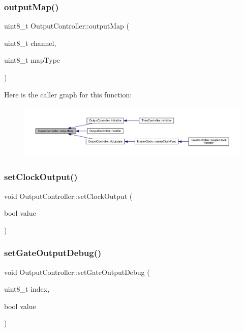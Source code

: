 \subsubsection{\texorpdfstring{output\+Map()}{outputMap()}}
{\footnotesize\ttfamily uint8\+\_\+t Output\+Controller\+::output\+Map (\begin{DoxyParamCaption}\item[{uint8\+\_\+t}]{channel,  }\item[{uint8\+\_\+t}]{map\+Type }\end{DoxyParamCaption})}

Here is the caller graph for this function\+:
\nopagebreak
\begin{figure}[H]
\begin{center}
\leavevmode
\includegraphics[width=350pt]{class_output_controller_af87eb8cce270ad31c3875208e36f9bc6_icgraph}
\end{center}
\end{figure}
\mbox{\label{class_output_controller_a4057f254aeb8e2d6eed51bc9f76eb2e2}} 
\subsubsection{\texorpdfstring{set\+Clock\+Output()}{setClockOutput()}}
{\footnotesize\ttfamily void Output\+Controller\+::set\+Clock\+Output (\begin{DoxyParamCaption}\item[{bool}]{value }\end{DoxyParamCaption})}

\mbox{\label{class_output_controller_ab821df3ba8e657761c9ae53e4bda458a}} 
\subsubsection{\texorpdfstring{set\+Gate\+Output\+Debug()}{setGateOutputDebug()}}
{\footnotesize\ttfamily void Output\+Controller\+::set\+Gate\+Output\+Debug (\begin{DoxyParamCaption}\item[{uint8\+\_\+t}]{index,  }\item[{bool}]{value }\end{DoxyParamCaption})}



